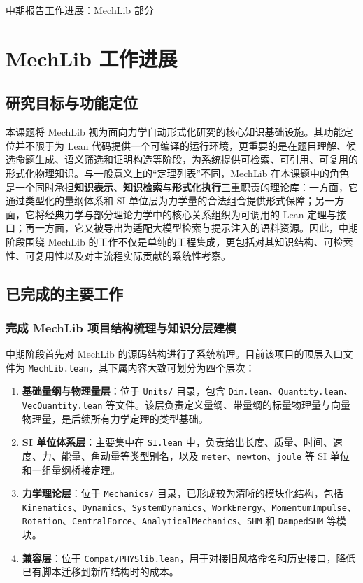 \documentclass[12pt,a4paper]{ctexart}
\begin{document}
\begin{center}
    {\heiti 中期报告工作进展：MechLib 部分}
\end{center}

\section{MechLib 工作进展}

\subsection{研究目标与功能定位}

本课题将 MechLib 视为面向力学自动形式化研究的核心知识基础设施。其功能定位并不限于为 Lean 代码提供一个可编译的运行环境，更重要的是在题目理解、候选命题生成、语义筛选和证明构造等阶段，为系统提供可检索、可引用、可复用的形式化物理知识。与一般意义上的“定理列表”不同，MechLib 在本课题中的角色是一个同时承担\textbf{知识表示}、\textbf{知识检索}与\textbf{形式化执行}三重职责的理论库：一方面，它通过类型化的量纲体系和 SI 单位层为力学量的合法组合提供形式保障；另一方面，它将经典力学与部分理论力学中的核心关系组织为可调用的 Lean 定理与接口；再一方面，它又被导出为适配大模型检索与提示注入的语料资源。因此，中期阶段围绕 MechLib 的工作不仅是单纯的工程集成，更包括对其知识结构、可检索性、可复用性以及对主流程实际贡献的系统性考察。

\subsection{已完成的主要工作}

\subsubsection{完成 MechLib 项目结构梳理与知识分层建模}

中期阶段首先对 MechLib 的源码结构进行了系统梳理。目前该项目的顶层入口文件为 \texttt{MechLib.lean}，其下属内容大致可划分为四个层次：

\begin{enumerate}
    \item \textbf{基础量纲与物理量层}：位于 \texttt{Units/} 目录，包含 \texttt{Dim.lean}、\texttt{Quantity.lean}、\texttt{VecQuantity.lean} 等文件。该层负责定义量纲、带量纲的标量物理量与向量物理量，是后续所有力学定理的类型基础。
    \item \textbf{SI 单位体系层}：主要集中在 \texttt{SI.lean} 中，负责给出长度、质量、时间、速度、力、能量、角动量等类型别名，以及 \texttt{meter}、\texttt{newton}、\texttt{joule} 等 SI 单位和一组量纲桥接定理。
    \item \textbf{力学理论层}：位于 \texttt{Mechanics/} 目录，已形成较为清晰的模块化结构，包括 \texttt{Kinematics}、\texttt{Dynamics}、\texttt{SystemDynamics}、\texttt{WorkEnergy}、\texttt{MomentumImpulse}、\texttt{Rotation}、\texttt{CentralForce}、\texttt{AnalyticalMechanics}、\texttt{SHM} 和 \texttt{DampedSHM} 等模块。
    \item \textbf{兼容层}：位于 \texttt{Compat/PHYSlib.lean}，用于对接旧风格命名和历史接口，降低已有脚本迁移到新库结构时的成本。
\end{enumerate}
\end{document}
